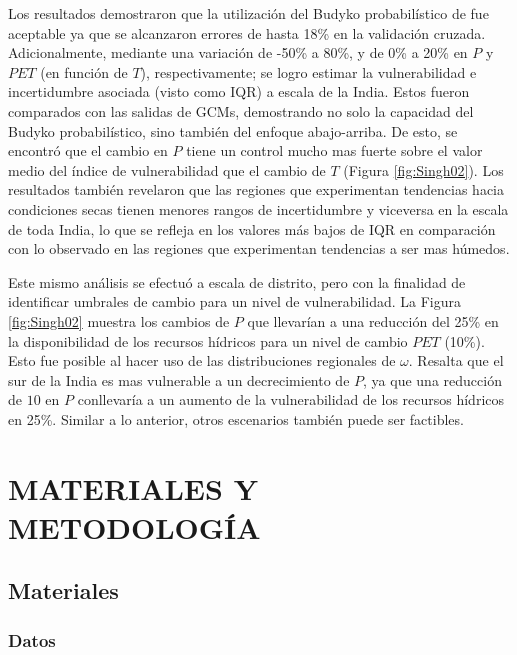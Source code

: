 \documentclass[12pt]{article}
\begin{document}
Los resultados demostraron que la utilización del Budyko probabilístico de \citet{Singh2015} fue aceptable ya que se alcanzaron errores de hasta 18\% en la validación cruzada. Adicionalmente, mediante una variación de -50\% a 80\%, y de 0\% a 20\% en $P$ y $PET$ (en función de $T$), respectivamente; se logro estimar la vulnerabilidad e incertidumbre asociada (visto como IQR) a escala de la India. Estos fueron comparados con las salidas de GCMs, demostrando no solo la capacidad del Budyko probabilístico, sino también del enfoque abajo-arriba. De esto, se encontró que el cambio en $P$ tiene un control mucho mas fuerte sobre el valor medio del índice de vulnerabilidad que el cambio de $T$ (Figura \ref{fig:Singh02}). Los resultados también revelaron que las regiones que experimentan tendencias hacia condiciones secas tienen menores rangos de incertidumbre y viceversa en la escala de toda India, lo que se refleja en los valores más bajos de IQR en comparación con lo observado en las regiones que experimentan tendencias a ser mas húmedos.

Este mismo análisis se efectuó a escala de distrito, pero con la finalidad de identificar umbrales de cambio para un nivel de vulnerabilidad. La Figura \ref{fig:Singh02} muestra los cambios de $P$ que llevarían a una reducción del 25\% en la disponibilidad de los recursos hídricos para un nivel de cambio $PET$ (10\%). Esto fue posible al hacer uso de las distribuciones regionales de $\omega$. Resalta que el sur de la India es mas vulnerable a un decrecimiento de $P$, ya que una reducción de $10$ en $P$ conllevaría a un aumento de la vulnerabilidad de los recursos hídricos en 25\%. Similar a lo anterior, otros escenarios también puede ser factibles. 





\clearpage
\vspace*{0.5mm}
\section{MATERIALES Y METODOLOGÍA}

\subsection{Materiales}

\subsubsection{Datos}
\end{document}

